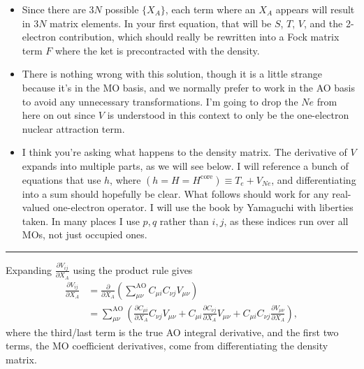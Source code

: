 \documentclass[%
class = book,%
crop = false,%
float = true,%
multi = true,%
preview = false,%
]{standalone}
\begin{document}
\begin{itemize}
\item Since there are \(3N\) possible \(\{X_{A}\}\), each term where an \(X_{A}\) appears will result in \(3N\) matrix elements. In your first equation, that will be \(S\), \(T\), \(V\), and the 2-electron contribution, which should really be rewritten into a Fock matrix term \(F\) where the ket is precontracted with the density.
\item There is nothing wrong with this solution, though it is a little strange because it's in the MO basis, and we normally prefer to work in the AO basis to avoid any unnecessary transformations. I'm going to drop the \(Ne\) from here on out since \(V\) is understood in this context to only be the one-electron nuclear attraction term.
\item I think you're asking what happens to the density matrix. The derivative of \(V\) expands into multiple parts, as we will see below. I will reference a bunch of equations that use \(h\), where \(\left( h = H = H^{\text{core}} \right) \equiv T_{e} + V_{Ne}\), and differentiating into a sum should hopefully be clear. What follows should work for any real-valued one-electron operator. I will use the book by Yamaguchi with liberties taken. In many places I use \(p,q\) rather than \(i,j\), as these indices run over all MOs, not just occupied ones.
\end{itemize}

\begin{center}\rule{0.5\linewidth}{\linethickness}\end{center}

Expanding \(\frac{\partial V_{ij}}{\partial X_{A}}\) using the product rule gives
\begin{align*}
  \frac{\partial V_{ij}}{\partial X_{A}} &= \frac{\partial}{\partial X_{A}} \left( \sum_{\mu\nu}^{\text{AO}} C_{\mu i} C_{\nu j} V_{\mu\nu} \right) \tag{Yamaguchi eq. 3.80} \\
                                         &= \sum_{\mu\nu}^{\text{AO}} \left( \frac{\partial C_{\mu i}}{\partial X_{A}} C_{\nu j} V_{\mu\nu} + C_{\mu i} \frac{\partial C_{\nu j}}{\partial X_{A}} V_{\mu\nu} + C_{\mu i} C_{\nu j} \frac{\partial V_{\mu\nu}}{\partial X_{A}} \right), \label{3.81}\tag{Yamaguchi eq. 3.81}
\end{align*}
where the third/last term is the true AO integral derivative, and the first two terms, the MO coefficient derivatives, come from differentiating the density matrix.
\end{document}
